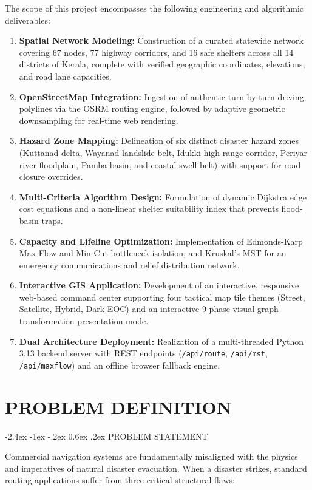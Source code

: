 \documentclass[12pt,oneside]{report}
\makeatletter
\renewcommand{\section}{\@startsection{section}{1}{\z@}%
  {-2.4ex \@plus -1ex \@minus -.2ex}%
  {0.6ex \@plus .2ex}%
  {\normalfont\large\bfseries}}
\newcommand{\chapterpage}[1]{\chapter{#1}}
\makeatother
\begin{document}
The scope of this project encompasses the following engineering and algorithmic deliverables:
\begin{enumerate}
    \item \textbf{Spatial Network Modeling:} Construction of a curated statewide network covering 67 nodes, 77 highway corridors, and 16 safe shelters across all 14 districts of Kerala, complete with verified geographic coordinates, elevations, and road lane capacities.
    \item \textbf{OpenStreetMap Integration:} Ingestion of authentic turn-by-turn driving polylines via the OSRM routing engine, followed by adaptive geometric downsampling for real-time web rendering.
    \item \textbf{Hazard Zone Mapping:} Delineation of six distinct disaster hazard zones (Kuttanad delta, Wayanad landslide belt, Idukki high-range corridor, Periyar river floodplain, Pamba basin, and coastal swell belt) with support for road closure overrides.
    \item \textbf{Multi-Criteria Algorithm Design:} Formulation of dynamic Dijkstra edge cost equations and a non-linear shelter suitability index that prevents flood-basin traps.
    \item \textbf{Capacity and Lifeline Optimization:} Implementation of Edmonds-Karp Max-Flow and Min-Cut bottleneck isolation, and Kruskal's MST for an emergency communications and relief distribution network.
    \item \textbf{Interactive GIS Application:} Development of an interactive, responsive web-based command center supporting four tactical map tile themes (Street, Satellite, Hybrid, Dark EOC) and an interactive 9-phase visual graph transformation presentation mode.
    \item \textbf{Dual Architecture Deployment:} Realization of a multi-threaded Python 3.13 backend server with REST endpoints (\texttt{/api/route}, \texttt{/api/mst}, \texttt{/api/maxflow}) and an offline browser fallback engine.
\end{enumerate}

\clearpage

\chapterpage{PROBLEM DEFINITION}

\section{PROBLEM STATEMENT}

Commercial navigation systems are fundamentally misaligned with the physics and imperatives of natural disaster evacuation. When a disaster strikes, standard routing applications suffer from three critical structural flaws:
\end{document}
